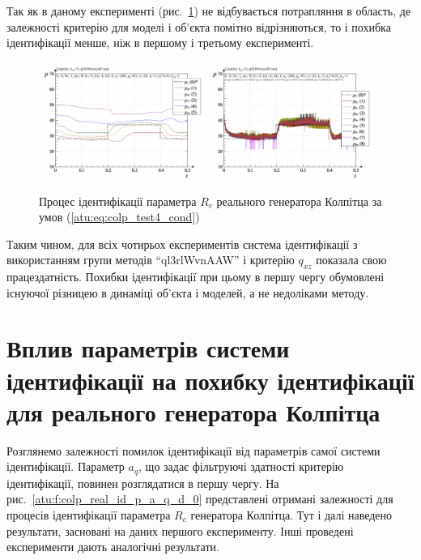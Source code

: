 Так як в даному експерименті (рис.~\ref{atu:f:colp_r_id_4}) не відбувається
потрапляння в область, де залежності критерію для моделі
і об'єкта помітно відрізняються, то і похибка ідентифікації
менше, ніж в першому і третьому експерименті.

\begin{figure}[htb!]
  \centerline{
    \includegraphics[width=0.48\textwidth]{p/r/colp_real_id-p_t_pi_ql3rlWvnAAW_real_d_3.png}
    \hfill
    \includegraphics[width=0.48\textwidth]{p/r/colp_real_id-p_t_p_ql3rlWvnAAW_real_d_3.png}
  }
\caption{Процес ідентифікації параметра $ R_c $ реального генератора Колпітца за умов (\ref{atu:eq:colp_test4_cond})}
  \label{atu:f:colp_r_id_4}
\end{figure}

Таким чином, для всіх чотирьох експериментів система
ідентифікації з використанням групи методів ``ql3rlWvnAAW'' і
критерію
$ q_{xz} $ показала свою працездатність. Похибки ідентифікації при
цьому в першу чергу обумовлені існуючої різницею в динаміці
об'єкта і моделей, а не недоліками методу.



\section{Вплив параметрів системи ідентифікації на похибку ідентифікації для реального генератора Колпітца} %


Розглянемо залежності помилок ідентифікації від параметрів
самої системи ідентифікації. Параметр
$a_q$, що задає фільтруючі здатності критерію ідентифікації,
повинен розглядатися в першу чергу. На рис.~\ref{atu:f:colp_real_id_p_a_q_d_0}
представлені отримані залежності для процесів ідентифікації
параметра
$ R_c $ генератора Колпітца. Тут і далі наведено результати,
засновані на даних першого експерименту. Інші проведені
експерименти дають аналогічні результати.

